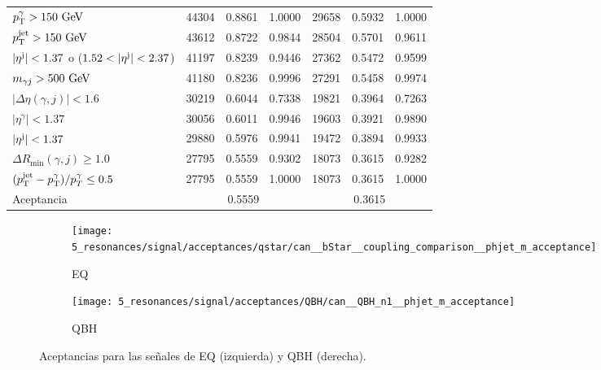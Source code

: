 \begin{table}[ht!]
{\begin{tabular}{lrrrrrr}
            $p_{\text{T}}^{\gamma} > 150~\text{GeV}$                                     & 44304 & 0.8861 & 1.0000               & 29658 & 0.5932 & 1.0000 \\
            $p_{\text{T}}^\text{jet} > 150~\text{GeV}$                                     & 43612 & 0.8722 & 0.9844               & 28504 & 0.5701 & 0.9611 \\
            $|\eta^{\text{j}}| < 1.37$ o ($1.52 < |\eta^{\text{j}}| < 2.37$)        & 41197 & 0.8239 & 0.9446               & 27362 & 0.5472 & 0.9599 \\
            $m_{\gamma j} > 500~\text{GeV}$                               & 41180 & 0.8236 & 0.9996               & 27291 & 0.5458 & 0.9974 \\
            $|\Delta\eta(\gamma,j)| < 1.6$                          & 30219 & 0.6044 & 0.7338               & 19821 & 0.3964 & 0.7263 \\
            $|\eta^{\gamma}| < 1.37$                                & 30056 & 0.6011 & 0.9946               & 19603 & 0.3921 & 0.9890 \\
            $|\eta^{\text{j}}| < 1.37$                                      & 29880 & 0.5976 & 0.9941               & 19472 & 0.3894 & 0.9933 \\
            $\Delta R_{\text{min}}(\gamma,j) \geq 1.0$              & 27795 & 0.5559 & 0.9302               & 18073 & 0.3615 & 0.9282 \\
            $(p_{\text{T}}^\text{jet} - p_{\text{T}}^{\gamma}) / p_{T}^{\gamma} \leq 0.5$           & 27795 & 0.5559 & 1.0000               & 18073 & 0.3615 & 1.0000 \\
            \midrule
            Aceptancia                                              & \multicolumn{3}{c}{0.5559}            & \multicolumn{3}{c}{0.3615} \\
            \bottomrule
        \end{tabular}
    }
    \label{tab:signals:acc_eff:acceptances}
\end{table}

\begin{figure}[ht!]
    \centering
    \begin{subfigure}[h]{0.49\linewidth}
        \centering
        \texttt{[image: 5\_resonances/signal/acceptances/qstar/can\_\_bStar\_\_coupling\_comparison\_\_phjet\_m\_acceptance]}
        \caption{\ac{EQ}}
        \label{fig:signals:acc_eff:acceptances:qstar}
    \end{subfigure}
    \hfill
    \begin{subfigure}[h]{0.49\linewidth}
        \centering
        \texttt{[image: 5\_resonances/signal/acceptances/QBH/can\_\_QBH\_n1\_\_phjet\_m\_acceptance]}
        \caption{\ac{QBH}}
        \label{fig:signals:acc_eff:acceptances:qbh}
    \end{subfigure}
    \caption{Aceptancias para las señales de \ac{EQ} (izquierda) y \ac{QBH} (derecha).}
    \label{fig:signals:acc_eff:acceptances}
\end{figure}

